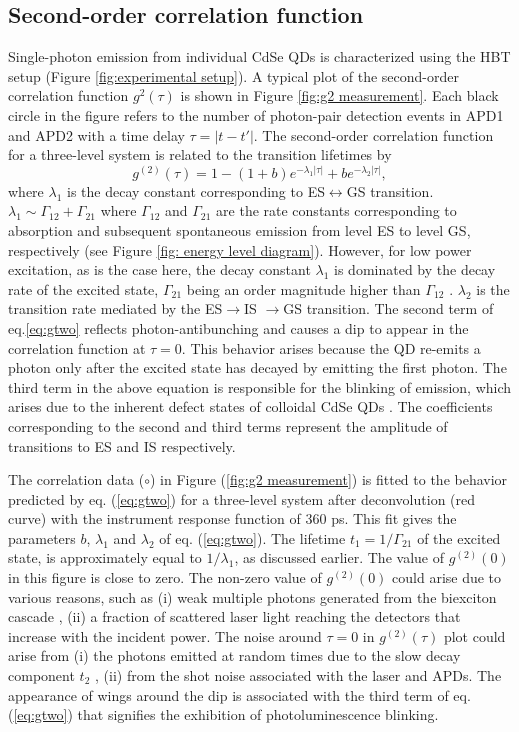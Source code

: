\documentclass[%
 aip,
 amsmath,amssymb,
 reprint,%
]{revtex4-1}
\begin{document}
\subsection{\textbf{Second-order correlation function}}
Single-photon emission from individual CdSe QDs is characterized using the HBT setup (Figure \ref{fig:experimental setup}). A typical plot of the second-order correlation function $g^2(\tau)$ is shown in Figure \ref{fig:g2 measurement}. Each black circle in the figure refers to the number of photon-pair detection events in APD1 and APD2 with a time delay $\tau = |t - t'|$. The second-order correlation function for a three-level system is related to the transition lifetimes by \cite{SS, TT}
\begin{equation}
g^{(2)}(\tau)=1-(1+b)e^{-\lambda_1 |\tau|}+be^{-\lambda_2 |\tau|},
\label{eq:gtwo}
\end{equation}
\noindent where $\lambda_1$ is the decay constant corresponding to ES$\leftrightarrow$GS transition.  $\lambda_1 \sim \Gamma_{12} + \Gamma_{21}$ where $\Gamma_{12}$ and $\Gamma_{21}$ are the rate constants corresponding to absorption and subsequent spontaneous emission from level ES to level GS, respectively (see Figure \ref{fig: energy level diagram}). However, for low power excitation, as is the case here, the decay constant $\lambda_1$ is dominated by the decay rate of the excited state, $\Gamma_{21}$ being an order magnitude higher than $\Gamma_{12}$ \cite{TT}. $\lambda_2$ is the transition rate mediated by the ES$\rightarrow$IS $\rightarrow$GS transition. The second term of eq.\eqref{eq:gtwo} reflects photon-antibunching and causes a dip to appear in the correlation function at $\tau = 0$. This behavior arises because the QD re-emits a photon only after the excited state has decayed by emitting the first photon. The third term in the above equation is responsible for the blinking of emission, which arises due to the inherent defect states of colloidal CdSe QDs \cite{KK}. The coefficients corresponding to the second and third terms represent the amplitude of transitions to ES and IS respectively.
 
The correlation data ($\circ$) in Figure (\ref{fig:g2 measurement}) is fitted to the behavior predicted by eq. (\ref{eq:gtwo}) for a three-level system after deconvolution (red curve) with the instrument response function of 360 ps. This fit gives the parameters $b$, $\lambda_1$ and $\lambda_2$ of eq. (\ref{eq:gtwo}). The lifetime $t_1 = 1/\Gamma_{21}$  of the excited state, is approximately equal to $1/\lambda_1$, as discussed earlier. The value of $g^{(2)}(0)$ in this figure is close to zero.  The non-zero value of $g^{(2)}(0)$ could arise due to various reasons, such as (i) weak multiple photons generated from the biexciton cascade \cite{WW}, (ii) a fraction of scattered laser light reaching the detectors that increase with the incident power. The noise around $\tau = 0$ in $g^{(2)}(\tau)$ plot could arise from (i) the photons emitted at random times due to the slow decay component $t_2$ \cite{XX}, (ii) from the shot noise associated with the laser and APDs. The appearance of wings around the dip is associated with the third term of eq. (\ref{eq:gtwo}) that signifies the exhibition of photoluminescence blinking.
\end{document}
